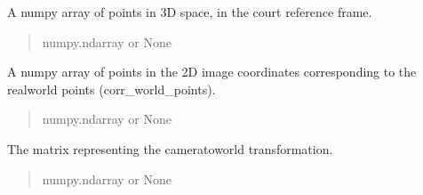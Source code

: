 \documentclass[letterpaper,10pt,english]{sphinxmanual}
\begin{document}
\begin{fulllineitems}
\begin{fulllineitems}
\end{fulllineitems}


\begin{fulllineitems}
\label{\detokenize{CameraUtils:CameraUtils.Camera.corr_world_points}}
\pysigstartsignatures
{}
\pysigstopsignatures
\sphinxAtStartPar
A numpy array of points in 3D space, in the court reference frame.
\begin{quote}\begin{description}
\sphinxAtStartPar
numpy.ndarray or None

\end{description}\end{quote}

\end{fulllineitems}


\begin{fulllineitems}
\label{\detokenize{CameraUtils:CameraUtils.Camera.corr_image_points}}
\pysigstartsignatures
{}
\pysigstopsignatures
\sphinxAtStartPar
A numpy array of points in the 2D image coordinates corresponding to
the real\sphinxhyphen{}world points (corr\_world\_points).
\begin{quote}\begin{description}
\sphinxAtStartPar
numpy.ndarray or None

\end{description}\end{quote}

\end{fulllineitems}


\begin{fulllineitems}
\label{\detokenize{CameraUtils:CameraUtils.Camera.ext_mtx}}
\pysigstartsignatures
{}
\pysigstopsignatures
\sphinxAtStartPar
The matrix representing the camera\sphinxhyphen{}to\sphinxhyphen{}world transformation.
\begin{quote}\begin{description}
\sphinxAtStartPar
numpy.ndarray or None


\end{description}
\end{quote}
\end{fulllineitems}
\end{fulllineitems}
\end{document}
